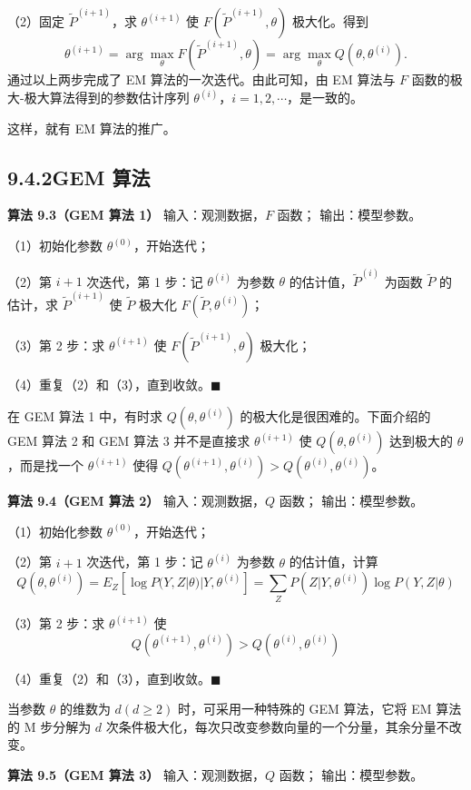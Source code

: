 \documentclass[UTF8, 12pt, fontset=fandol, oneside]{ctexart}
\begin{document}
（2）固定 $\tilde{P}^{(i+1)}$，求 $\theta^{(i+1)}$ 使 $F(\tilde{P}^{(i+1)},\theta)$ 极大化。得到
\[
  \theta^{(i+1)}=\arg\max_{\theta}F(\tilde{P}^{(i+1)},\theta)
  =\arg\max_{\theta}Q(\theta,\theta^{(i)}).
\]
通过以上两步完成了 EM 算法的一次迭代。由此可知，由 EM 算法与 $F$ 函数的极大-极大算法得到的参数估计序列 $\theta^{(i)}$，$i=1,2,\cdots$，是一致的。

这样，就有 EM 算法的推广。

\subsection*{9.4.2\quad GEM 算法}

\noindent\textbf{算法 9.3（GEM 算法 1）}\quad
输入：观测数据，$F$ 函数；
输出：模型参数。

（1）初始化参数 $\theta^{(0)}$，开始迭代；

（2）第 $i+1$ 次迭代，第 1 步：记 $\theta^{(i)}$ 为参数 $\theta$ 的估计值，$\tilde{P}^{(i)}$ 为函数 $\tilde{P}$ 的估计，求 $\tilde{P}^{(i+1)}$ 使 $\tilde{P}$ 极大化 $F(\tilde{P},\theta^{(i)})$；

（3）第 2 步：求 $\theta^{(i+1)}$ 使 $F(\tilde{P}^{(i+1)},\theta)$ 极大化；

（4）重复（2）和（3），直到收敛。\hfill$\blacksquare$

在 GEM 算法 1 中，有时求 $Q(\theta,\theta^{(i)})$ 的极大化是很困难的。下面介绍的 GEM 算法 2 和 GEM 算法 3 并不是直接求 $\theta^{(i+1)}$ 使 $Q(\theta,\theta^{(i)})$ 达到极大的 $\theta$，而是找一个 $\theta^{(i+1)}$ 使得 $Q(\theta^{(i+1)},\theta^{(i)})>Q(\theta^{(i)},\theta^{(i)})$。

\noindent\textbf{算法 9.4（GEM 算法 2）}\quad
输入：观测数据，$Q$ 函数；
输出：模型参数。

（1）初始化参数 $\theta^{(0)}$，开始迭代；

（2）第 $i+1$ 次迭代，第 1 步：记 $\theta^{(i)}$ 为参数 $\theta$ 的估计值，计算
\[
Q(\theta,\theta^{(i)})=E_Z[\log P(Y,Z|\theta)|Y,\theta^{(i)}]
=\sum_ZP(Z|Y,\theta^{(i)})\log P(Y,Z|\theta)
\]

（3）第 2 步：求 $\theta^{(i+1)}$ 使
\[
Q(\theta^{(i+1)},\theta^{(i)})>Q(\theta^{(i)},\theta^{(i)})
\]

（4）重复（2）和（3），直到收敛。\hfill$\blacksquare$

当参数 $\theta$ 的维数为 $d(d\geqslant 2)$ 时，可采用一种特殊的 GEM 算法，它将 EM 算法的 M 步分解为 $d$ 次条件极大化，每次只改变参数向量的一个分量，其余分量不改变。

\noindent\textbf{算法 9.5（GEM 算法 3）}\quad
输入：观测数据，$Q$ 函数；
输出：模型参数。
\end{document}
